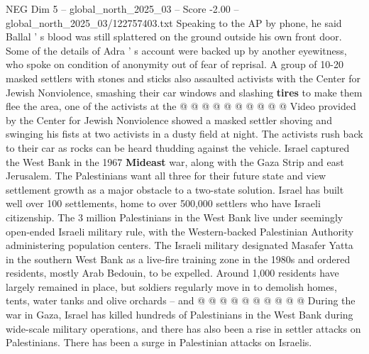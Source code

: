 \begin{textsample}{NEG Dim 5 – global\_north\_2025\_03 – Score -2.00 – global\_north\_2025\_03/122757403.txt}
Speaking to the AP by phone, he said Ballal ' s blood was still splattered on the ground outside his own front door.
Some of the details of Adra ' s account were backed up by another eyewitness, who spoke on condition of anonymity out of fear of reprisal.
A group of 10-20 masked settlers with stones and sticks also assaulted activists with the Center for Jewish Nonviolence, smashing their car windows and slashing \textbf{tires} to make them flee the area, one of the activists at the @ @ @ @ @ @ @ @ @ @ Video provided by the Center for Jewish Nonviolence showed a masked settler shoving and swinging his fists at two activists in a dusty field at night.
The activists rush back to their car as rocks can be heard thudding against the vehicle.
Israel captured the West Bank in the 1967 \textbf{Mideast} war, along with the Gaza Strip and east Jerusalem.
The Palestinians want all three for their future state and view settlement growth as a major obstacle to a two-state solution.
Israel has built well over 100 settlements, home to over 500,000 settlers who have Israeli citizenship.
The 3 million Palestinians in the West Bank live under seemingly open-ended Israeli military rule, with the Western-backed Palestinian Authority administering population centers.
The Israeli military designated Masafer Yatta in the southern West Bank as a live-fire training zone in the 1980s and ordered residents, mostly Arab Bedouin, to be expelled.
Around 1,000 residents have largely remained in place, but soldiers regularly move in to demolish homes, tents, water tanks and olive orchards -- and @ @ @ @ @ @ @ @ @ @ During the war in Gaza, Israel has killed hundreds of Palestinians in the West Bank during wide-scale military operations, and there has also been a rise in settler attacks on Palestinians.
There has been a surge in Palestinian attacks on Israelis.

\end{textsample}
